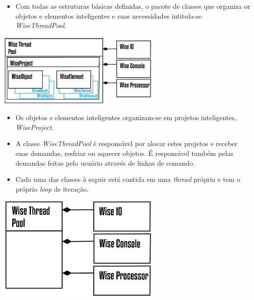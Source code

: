 \documentclass[10pt,aspectratio=169]{beamer}
\theoremstyle{remark}
\theoremstyle{definition}
\begin{document}
\begin{frame}[allowframebreaks]
		\begin{itemize}
				\item Com todas as estruturas básicas definidas, o pacote de classes que organiza or objetos e elementos inteligentes e suas necessidades intitula-se \textit{WiseThreadPool}.
		\end{itemize}		
	
	\begin{center}
		
		\item \includegraphics[width=0.6\textwidth]{Figures/WiseThreadPool@16x.png}
		
	\end{center}
	
	\framebreak
	
	\begin{itemize}
		\item Os objetos e elementos inteligentes organizam-se em projetos inteligentes, \textit{WiseProject}.
		\item A classe \textit{WiseThreadPool} é responsável por alocar estes projetos e receber suas demandas, resfriar ou aquecer objetos. É responsável também pelas demandas feitas pelo usuário através de linhas de comando.
	\end{itemize}
	
	\framebreak
	
	\begin{itemize}
		\item Cada uma das classes à seguir está contida em uma \textit{thread} própria e tem o próprio \textit{loop} de iteração.
	\end{itemize}		
	
	\begin{center}
		
		\item \includegraphics[width=0.6\textwidth]{Figures/WiseThreadPool2@16x.png}
		

\end{center}
\end{frame}
\end{document}
